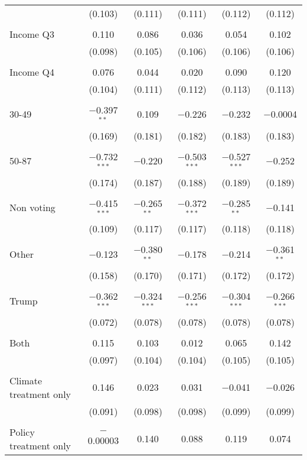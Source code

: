 \begin{tabular}{@{\extracolsep{5pt}}lccccc}
  & (0.103) & (0.111) & (0.111) & (0.112) & (0.112) \\ 
  & & & & & \\ 
 Income Q3 & 0.110 & 0.086 & 0.036 & 0.054 & 0.102 \\ 
  & (0.098) & (0.105) & (0.106) & (0.106) & (0.106) \\ 
  & & & & & \\ 
 Income Q4 & 0.076 & 0.044 & 0.020 & 0.090 & 0.120 \\ 
  & (0.104) & (0.111) & (0.112) & (0.113) & (0.113) \\ 
  & & & & & \\ 
 30-49 & $-$0.397$^{**}$ & 0.109 & $-$0.226 & $-$0.232 & $-$0.0004 \\ 
  & (0.169) & (0.181) & (0.182) & (0.183) & (0.183) \\ 
  & & & & & \\ 
 50-87 & $-$0.732$^{***}$ & $-$0.220 & $-$0.503$^{***}$ & $-$0.527$^{***}$ & $-$0.252 \\ 
  & (0.174) & (0.187) & (0.188) & (0.189) & (0.189) \\ 
  & & & & & \\ 
 Non voting & $-$0.415$^{***}$ & $-$0.265$^{**}$ & $-$0.372$^{***}$ & $-$0.285$^{**}$ & $-$0.141 \\ 
  & (0.109) & (0.117) & (0.117) & (0.118) & (0.118) \\ 
  & & & & & \\ 
 Other & $-$0.123 & $-$0.380$^{**}$ & $-$0.178 & $-$0.214 & $-$0.361$^{**}$ \\ 
  & (0.158) & (0.170) & (0.171) & (0.172) & (0.172) \\ 
  & & & & & \\ 
 Trump & $-$0.362$^{***}$ & $-$0.324$^{***}$ & $-$0.256$^{***}$ & $-$0.304$^{***}$ & $-$0.266$^{***}$ \\ 
  & (0.072) & (0.078) & (0.078) & (0.078) & (0.078) \\ 
  & & & & & \\ 
 Both & 0.115 & 0.103 & 0.012 & 0.065 & 0.142 \\ 
  & (0.097) & (0.104) & (0.104) & (0.105) & (0.105) \\ 
  & & & & & \\ 
 Climate treatment only & 0.146 & 0.023 & 0.031 & $-$0.041 & $-$0.026 \\ 
  & (0.091) & (0.098) & (0.098) & (0.099) & (0.099) \\ 
  & & & & & \\ 
 Policy treatment only & $-$0.00003 & 0.140 & 0.088 & 0.119 & 0.074 \\ 

\end{tabular}
